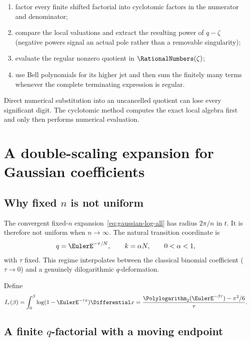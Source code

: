 \documentclass[11pt,oneside]{article}
\theoremstyle{definition}
\theoremstyle{remark}
\let\reporttopsection\section
\let\reportsubsection\subsection
\let\chapter\reporttopsection
\let\section\reportsubsection
\begin{document}
\begin{enumerate}[label=\arabic*.]
\item factor every finite shifted factorial into cyclotomic factors in the
      numerator and denominator;
\item compare the local valuations and extract the resulting power of
      $q-\zeta$ (negative powers signal an actual pole rather than a removable
      singularity);
\item evaluate the regular nonzero quotient in $\RationalNumbers(\zeta)$;
\item use Bell polynomials for its higher jet and then sum the finitely many
      terms whenever the complete terminating expression is regular.
\end{enumerate}

Direct numerical substitution into an uncancelled quotient can lose every
significant digit.  The cyclotomic method computes the exact local algebra
first and only then performs numerical evaluation.

\chapter{A double-scaling expansion for Gaussian coefficients}
\label{chap:double-scaling}

\section{Why fixed \texorpdfstring{$n$}{n} is not uniform}

The convergent fixed-$n$ expansion~\eqref{eq:gaussian-log-all} has radius
$2\pi/n$ in $t$.  It is therefore not uniform when $n\to\infty$.  The natural
transition coordinate is
\[
 q=\EulerE^{-\tau/N},
 \qquad k=\alpha N,
 \qquad 0<\alpha<1,
\]
with $\tau$ fixed.  This regime interpolates between the classical binomial
coefficient ($\tau\to0$) and a genuinely dilogarithmic $q$-deformation.

Define
\begin{equation}\label{eq:I-tau}
 I_\tau(\beta)=\int_0^\beta\log(1-\EulerE^{-\tau x})\Differential x
 =\frac{\Polylogarithm_2(\EulerE^{-\beta\tau})-\pi^2/6}{\tau}.
\end{equation}

\section{A finite \texorpdfstring{$q$}{q}-factorial with a moving endpoint}
\end{document}
